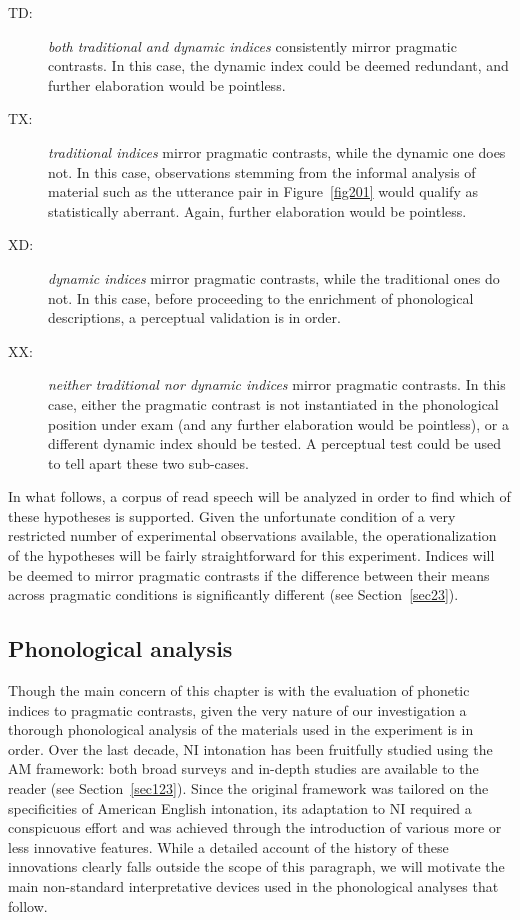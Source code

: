 \begin{description}
   \item[TD:] \textit{both traditional and dynamic indices} consistently mirror pragmatic contrasts. In this case, the dynamic index could be deemed redundant, and further elaboration would be pointless.
   \item[TX:] \textit{traditional indices} mirror pragmatic contrasts, while the dynamic one does not. In this case, observations stemming from the informal analysis of material such as the utterance pair in Figure~\ref{fig201} would qualify as statistically aberrant. Again, further elaboration would be pointless.
   \item[XD:] \textit{dynamic indices} mirror pragmatic contrasts, while the traditional ones do not. In this case, before proceeding to the enrichment of phonological descriptions, a perceptual validation is in order.
   \item[XX:] \textit{neither traditional nor dynamic indices} mirror pragmatic contrasts. In this case, either the pragmatic contrast is not instantiated in the phonological position under exam (and any further elaboration would be pointless), or a different dynamic index should be tested. A perceptual test could be used to tell apart these two sub-cases.
\end{description}

In what follows, a corpus of read speech will be analyzed in order to find which of these hypotheses is supported. Given the unfortunate condition of a very restricted number of experimental observations available, the operationalization of the hypotheses will be fairly straightforward for this experiment. Indices will be deemed to mirror pragmatic contrasts if the difference between their means across pragmatic conditions is significantly different (see Section~\ref{sec23}).

\subsection{Phonological analysis}\label{sec212}
Though the main concern of this chapter is with the evaluation of phonetic indices to pragmatic contrasts, given the very nature of our investigation a thorough phonological analysis of the materials used in the experiment is in order.
Over the last decade, NI intonation has been fruitfully studied using the AM framework: both broad surveys and in-depth studies are available to the reader (see Section~\ref{sec123}). Since the original framework was tailored on the specificities of American English intonation, its adaptation to NI required a conspicuous effort and was achieved through the introduction of various more or less innovative features. While a detailed account of the history of these innovations clearly falls outside the scope of this paragraph, we will motivate the main non-standard interpretative devices used in the phonological analyses that follow.

